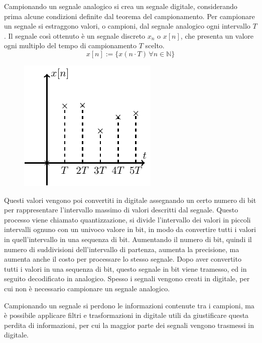 \documentclass{article}
\numberwithin{equation}{subsection}
\begin{document}
Campionando un segnale analogico si crea un segnale digitale, considerando prima alcune condizioni definite dal teorema del campionamento. Per campionare un segnale si estraggono
valori, o campioni, dal segnale analogico ogni intervallo $T$. Il segnale così ottenuto è un segnale discreto $x_n$ o $x[n]$, che presenta un valore ogni multiplo del tempo di campionamento $T$ 
scelto. 
\begin{equation*}
    x[n]:=\{x(n\cdot T)\,\forall n\in\mathbb{N}\}
\end{equation*}

\begin{figure}[H]%
    \centering
    \includegraphics{segnale-discreto-1.pdf}%
    \label{fig:segnale-discreto-1}
\end{figure}

Questi valori vengono poi convertiti in digitale assegnando un certo numero di bit per rappresentare l'intervallo massimo di valori descritti dal segnale. Questo processo 
viene chiamato quantizzazione, si divide l'intervallo dei valori in piccoli intervalli ognuno con un univoco valore in bit, in modo da convertire tutti i valori in quell'intervallo in una sequenza di bit. Aumentando il numero di bit, quindi il numero di suddivisioni dell'intervallo di partenza, aumenta la precisione, ma aumenta anche il costo 
per processare lo stesso segnale. Dopo aver convertito tutti i valori in una sequenza di bit, questo segnale in bit viene tramesso, ed in seguito decodificato in analogico. 
Spesso i segnali vengono creati in digitale, per cui non è necessario campionare un segnale analogico. 


Campionando un segnale si perdono le informazioni contenute tra i campioni, ma è possibile applicare filtri e trasformazioni in digitale utili da giustificare questa perdita 
di informazioni, per cui la maggior parte dei segnali vengono trasmessi in digitale. 
\end{document}
